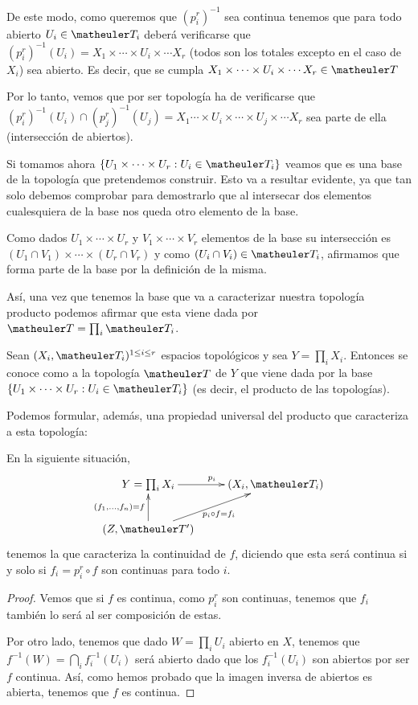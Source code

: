 De este modo, como queremos que $(p_i^r)^{-1}$ sea continua  tenemos que para todo abierto $U_i\in \T_i$ deberá verificarse que $(p_i^r)^{-1}(U_i)=X_1\times\cdots\times U_i\times\cdots X_r$ (todos son los totales excepto en el caso de $X_i$) sea abierto. Es decir, que se cumpla $X_1\times\cdots\times U_i \times\cdots X_r\in \T$

Por lo tanto, vemos que por ser topología ha de verificarse que $(p_i^r)^{-1}(U_i)\cap (p_j^r)^{-1}(U_j)= X_1\cdots\times U_i \times\cdots\times U_j\times \cdots X_r$ sea parte de ella (intersección de abiertos).

Si tomamos ahora $ \{ U_1\times\cdots\times U_r : U_i\in \T_i \}$ veamos que es una base de la topología que pretendemos construir. Esto va a resultar evidente, ya que tan solo debemos comprobar para demostrarlo que al intersecar dos elementos cualesquiera de la base nos queda otro elemento de la base. 

Como dados $U_1\times\cdots\times U_r$ y $V_1\times\cdots\times V_r$ elementos de la base su intersección es $(U_1\cap V_1)\times\cdots\times (U_r\cap V_r)$ y como $(U_i\cap V_i)\in \T_i$, afirmamos que forma parte de la base por la definición de la misma.

Así, una vez que tenemos la base que va a caracterizar nuestra topología producto podemos afirmar que esta viene dada por $\T=\prod_i \T_i$.

\begin{defi}
	Sean $(X_{i },\T_{i})^{1\le i\le r}$ espacios topológicos y sea $Y=\prod_i X_i$. Entonces se conoce como  a la topología $\T$ de $Y$ que viene dada por la base $ \{ U_1\times\cdots\times U_r : U_i\in \T_i \}$ (es decir, el producto de las topologías).
\end{defi}

Podemos formular, además, una propiedad universal del producto que caracteriza a esta topología:

\begin{lem}
	En la siguiente situación,
	\[\xymatrix{
		Y=\prod_i X_i \ar[r]^{p_i} & 
		(X_i,\T_i) \\
		(Z,\T') \ar[u]^{(f_1,\dots,f_n)=f} \ar[ru]_{p_i\circ f=f_i} &
	}\]
	tenemos la  que caracteriza la continuidad de $f$, diciendo que esta será continua si y solo si $f_i=p_i^r\circ f$ son continuas para todo $i$.
	
	\begin{proof}
		Vemos que si $f$ es continua, como $p_i^r$ son continuas, tenemos que $f_i$ también lo será al ser composición de estas.
		
		Por otro lado, tenemos que dado $W=\prod_iU_i$ abierto en $X$, tenemos que $f^{-1}(W)=\bigcap_i f_i^{-1}(U_i)$ será abierto dado que los $f_i^{-1}(U_i)$ son abiertos por ser $f$ continua. Así, como hemos probado que la imagen inversa de abiertos es abierta, tenemos que $f$ es continua.
	\end{proof}
\end{lem}

